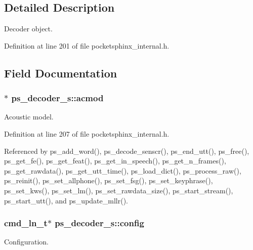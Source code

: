 \subsection{Detailed Description}
Decoder object. 

Definition at line 201 of file pocketsphinx\+\_\+internal.\+h.



\subsection{Field Documentation}
\subsubsection[{acmod}]{$\ast$ ps\+\_\+decoder\+\_\+s\+::acmod}\label{structps__decoder__s_af834d2bc1d44c1d9ef607b025413a0b8}


Acoustic model. 



Definition at line 207 of file pocketsphinx\+\_\+internal.\+h.



Referenced by ps\+\_\+add\+\_\+word(), ps\+\_\+decode\+\_\+senscr(), ps\+\_\+end\+\_\+utt(), ps\+\_\+free(), ps\+\_\+get\+\_\+fe(), ps\+\_\+get\+\_\+feat(), ps\+\_\+get\+\_\+in\+\_\+speech(), ps\+\_\+get\+\_\+n\+\_\+frames(), ps\+\_\+get\+\_\+rawdata(), ps\+\_\+get\+\_\+utt\+\_\+time(), ps\+\_\+load\+\_\+dict(), ps\+\_\+process\+\_\+raw(), ps\+\_\+reinit(), ps\+\_\+set\+\_\+allphone(), ps\+\_\+set\+\_\+fsg(), ps\+\_\+set\+\_\+keyphrase(), ps\+\_\+set\+\_\+kws(), ps\+\_\+set\+\_\+lm(), ps\+\_\+set\+\_\+rawdata\+\_\+size(), ps\+\_\+start\+\_\+stream(), ps\+\_\+start\+\_\+utt(), and ps\+\_\+update\+\_\+mllr().

\subsubsection[{config}]{\setlength{\rightskip}{0pt plus 5cm}cmd\+\_\+ln\+\_\+t$\ast$ ps\+\_\+decoder\+\_\+s\+::config}\label{structps__decoder__s_a0565ed97b32408bd05c8104f020cef05}


Configuration. 




